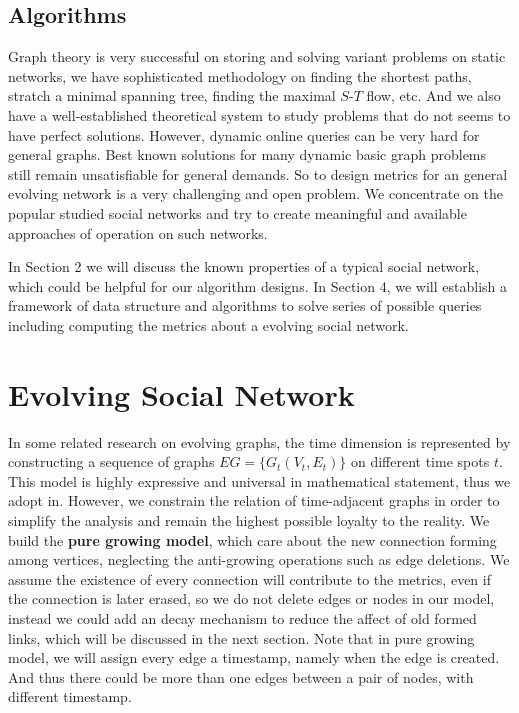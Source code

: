 \documentclass[12pt,abstract=true]{scrartcl}
\numberwithin{equation}{section}
\theoremstyle{definition}   \newtheorem{definition}{Definition}[section]
\theoremstyle{plain}        \newtheorem{theorem}{Theorem}[section]
\theoremstyle{plain}        \newtheorem{observation}{Observation}[section]
\theoremstyle{plain}        \newtheorem{fact}{Fact}[section]
\theoremstyle{plain}        \newtheorem{claim}{Claim}[section]
\theoremstyle{plain}        \newtheorem{lemma}[theorem]{Lemma}
\theoremstyle{plain}        \newtheorem{corollary}[theorem]{Corollary}
\theoremstyle{remark}       \newtheorem{example}{Example}[section]
\theoremstyle{remark}       \newtheorem{remark}{Remark}[section]
\begin{document}
\subsection{Algorithms}
Graph theory is very successful on storing and solving variant problems on
static networks, we have sophisticated methodology on finding the shortest
paths, stratch a minimal spanning tree, finding the maximal $S$-$T$ flow, etc.
And we also have a well-established theoretical system to study problems that
do not seems to have perfect solutions. However, dynamic online queries can be
very hard for general graphs. Best known solutions for many dynamic basic graph
problems still remain unsatisfiable for general demands. So to design metrics
for an general evolving network is a very challenging and open problem. We
concentrate on the popular studied social networks and try to create meaningful
and available approaches of operation on such networks.

In Section 2 we will discuss the known properties of a typical social network,
which could be helpful for our algorithm designs. In Section 4, we will
establish a framework of data structure and algorithms to solve series of
possible queries including computing the metrics about a evolving social
network.

\section{Evolving Social Network}
In some related research on evolving graphs, the time dimension is represented
by constructing a sequence of graphs $EG=\{G_t(V_t,E_t)\}$ on different time
spots $t$. This model is highly expressive and universal in mathematical
statement, thus we adopt in. However, we constrain the relation of
time-adjacent graphs in order to simplify the analysis and remain the highest
possible loyalty to the reality. We build the \textbf{pure growing model},
which care about the new connection forming among vertices, neglecting the
anti-growing operations such as edge deletions. We assume the existence of
every connection will contribute to the metrics, even if the connection is
later erased, so we do not delete edges or nodes in our model, instead we
could add an decay mechanism to reduce the affect of old formed links, which
will be discussed in the next section. Note that in pure growing model, we
will assign every edge a timestamp, namely when the edge is created. And thus
there could be more than one edges between a pair of nodes, with different
timestamp.
\end{document}
